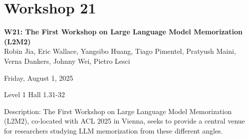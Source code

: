 \clearpage


\section[W21: The First Workshop on Large Language Model Memorization (L2M2)]{Workshop 21}
\label{workshop_21}

\begin{center}
    {\Large \textbf{W21: The First Workshop on Large Language Model Memorization (L2M2)}}\\
    

Robin Jia, Eric Wallace, Yangsibo Huang, Tiago Pimentel, Pratyush Maini, Verna Dankers, Johnny Wei, Pietro Lesci

    Friday, August 1, 2025

    Level 1 Hall 1.31-32
    
\end{center}

Description: The First Workshop on Large Language Model Memorization (L2M2), co-located with ACL 2025 in Vienna, seeks to provide a central venue for researchers studying LLM memorization from these different angles.

